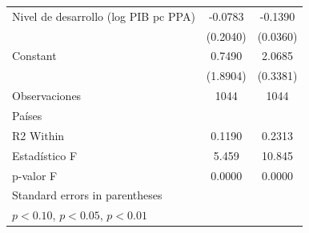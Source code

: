 \begin{table}[htbp]
\begin{tabular}{l*{2}{c}}
\addlinespace
Nivel de desarrollo (log PIB pc PPA)&     -0.0783         &     -0.1390\sym{***}\\
                    &    (0.2040)         &    (0.0360)         \\
\addlinespace
Constant            &      0.7490         &      2.0685\sym{***}\\
                    &    (1.8904)         &    (0.3381)         \\
\midrule
Observaciones       &        1044         &        1044         \\
Países              &                     &                     \\
R2 Within           &      0.1190         &      0.2313         \\
Estadístico F       &       5.459         &      10.845         \\
p-valor F           &      0.0000         &      0.0000         \\
\bottomrule
\multicolumn{3}{l}{\footnotesize Standard errors in parentheses}\\
\multicolumn{3}{l}{\footnotesize \sym{*} \(p<0.10\), \sym{**} \(p<0.05\), \sym{***} \(p<0.01\)}\\
\end{tabular}
\end{table}
